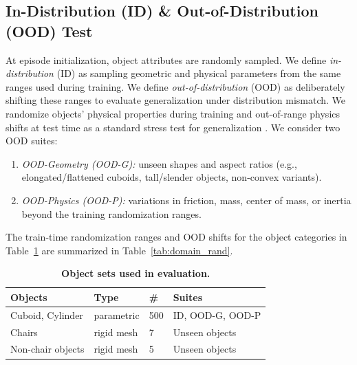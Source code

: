\subsection{In-Distribution (ID) \& Out-of-Distribution (OOD) Test}
\label{subsec:task_protocol}
At episode initialization, object attributes are randomly sampled. We define \textit{in-distribution} (ID) as sampling geometric and physical parameters from the same ranges used during training. We define \textit{out-of-distribution} (OOD) as deliberately shifting these ranges to evaluate generalization under distribution mismatch. We randomize objects' physical properties during training and out-of-range physics shifts at test time as a standard stress test for generalization \cite{Peng2018DynamicsRandomization}. We consider two OOD suites:
\begin{enumerate}
    \item \textit{OOD-Geometry (OOD-G):} unseen shapes and aspect ratios (e.g., elongated/flattened cuboids, tall/slender objects, non-convex variants).
    \item \textit{OOD-Physics (OOD-P):} variations in friction, mass, center of mass, or inertia beyond the training randomization ranges.
\end{enumerate}

The train-time randomization ranges and OOD shifts for the object categories in Table~\ref{tab:object_sets} 
are summarized in Table~\ref{tab:domain_rand}.

\begin{table}[t]
\caption{\textbf{Object sets used in evaluation.}}
\label{tab:object_sets}
\renewcommand{\arraystretch}{1.05}
\setlength{\tabcolsep}{4pt}
\small
\begin{tabular}{@{}p{2.75cm}p{1.35cm}p{0.75cm}p{3.1cm}@{}}
\toprule
\textbf{Objects} & \textbf{Type} & \textbf{\#} & \textbf{Suites} \\
\midrule
Cuboid, Cylinder & parametric & 500 & ID, OOD-G, OOD-P \\
Chairs & rigid mesh & 7 & Unseen objects \\
Non-chair objects & rigid mesh & 5 & Unseen objects \\
\bottomrule
\end{tabular}
\vspace{-0.6em}
\end{table}

